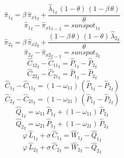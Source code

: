 \begin{dmath}
{{\hat{\pi}_{1}}}_{t}={{\beta}}\, {{\hat{\pi}_{x1}}}_{t}+\frac{{{\hat{\lambda}_{1}}}_{t}\, \left(1-{{\theta}}\right)\, \left(1-{{\beta}}\, {{\theta}}\right)}{{{\theta}}}
\end{dmath}
\begin{dmath}
{{\hat{\pi}_{1}}}_{t}-{{\hat{\pi}_{x1}}}_{t-1}={{sunspot_{1}}}_{t}
\end{dmath}
\begin{dmath}
{{\hat{\pi}_{2}}}_{t}={{\beta}}\, {{\hat{\pi}_{x2}}}_{t}+\frac{\left(1-{{\beta}}\, {{\theta}}\right)\, \left(1-{{\theta}}\right)\, {{\hat{\lambda}_{2}}}_{t}}{{{\theta}}}
\end{dmath}
\begin{dmath}
{{\hat{\pi}_{2}}}_{t}-{{\hat{\pi}_{x2}}}_{t-1}={{sunspot_{2}}}_{t}
\end{dmath}
\begin{dmath}
{{\hat{C}_{12}}}_{t}-{{\hat{C}_{11}}}_{t}={{\hat{P}_{1}}}_{t}-{{\hat{P}_{2}}}_{t}
\end{dmath}
\begin{dmath}
{{\hat{C}_{22}}}_{t}-{{\hat{C}_{21}}}_{t}={{\hat{P}_{1}}}_{t}-{{\hat{P}_{2}}}_{t}
\end{dmath}
\begin{dmath}
{{\hat{C}_{1}}}_{t}-{{\hat{C}_{11}}}_{t}=\left(1-{{\omega_{11}}}\right)\, \left({{\hat{P}_{1}}}_{t}-{{\hat{P}_{2}}}_{t}\right)
\end{dmath}
\begin{dmath}
{{\hat{C}_{2}}}_{t}-{{\hat{C}_{21}}}_{t}=\left(1-{{\omega_{21}}}\right)\, \left({{\hat{P}_{1}}}_{t}-{{\hat{P}_{2}}}_{t}\right)
\end{dmath}
\begin{dmath}
{{\hat{Q}_{1}}}_{t}={{\omega_{11}}}\, {{\hat{P}_{1}}}_{t}+\left(1-{{\omega_{11}}}\right)\, {{\hat{P}_{2}}}_{t}
\end{dmath}
\begin{dmath}
{{\hat{Q}_{2}}}_{t}={{\omega_{21}}}\, {{\hat{P}_{1}}}_{t}+\left(1-{{\omega_{21}}}\right)\, {{\hat{P}_{2}}}_{t}
\end{dmath}
\begin{dmath}
{{\varphi}}\, {{\hat{L}_{1}}}_{t}+{{\sigma}}\, {{\hat{C}_{1}}}_{t}={{\hat{W}_{1}}}_{t}-{{\hat{Q}_{1}}}_{t}
\end{dmath}
\begin{dmath}
{{\varphi}}\, {{\hat{L}_{2}}}_{t}+{{\sigma}}\, {{\hat{C}_{2}}}_{t}={{\hat{W}_{2}}}_{t}-{{\hat{Q}_{2}}}_{t}
\end{dmath}
